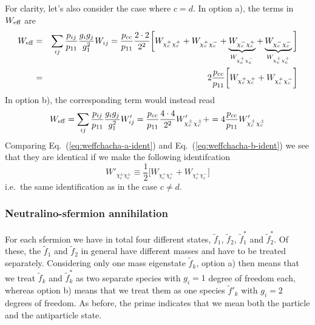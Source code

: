 \documentclass[a4paper,10pt,oneside]{book}
\begin{document}
For clarity, let's also consider the case where $c=d$.
In option a), the terms in $W_{\rm eff}$ are
\begin{eqnarray}
    W_{\rm eff} & = & \sum_{ij}\frac{p_{ij}}{p_{11}} 
    \frac{g_{i}g_{j}}{g_{1}^2} W_{ij}
    =
    \frac{p_{cc}}{p_{11}} \frac{2 \cdot 2}{2^2}
    \bigg[ 
    W_{\chi_{c}^+ \chi_{c}^+} +
    W_{\chi_{c}^+ \chi_{c}^-} +
    \underbrace{W_{\chi_{c}^- \chi_{c}^+}}_{W_{\chi_{c}^+ \chi_{c}^-}} +
    \underbrace{W_{\chi_{c}^- \chi_{c}^-}}_{W_{\chi_{c}^+ \chi_{c}^+}}
    \bigg] 
    \nonumber \\
    & = &
    2 \frac{p_{cc}}{p_{11}}
    \bigg[
    W_{\chi_{c}^+ \chi_{c}^+} +
    W_{\chi_{c}^+ \chi_{c}^-}
    \bigg]
    \label{eq:weffchacha-a-ident}
\end{eqnarray}
In option b), the corresponding term would instead read
\begin{equation}
    W_{\rm eff} = \sum_{ij}\frac{p_{ij}}{p_{11}} 
    \frac{g_{i}g_{j}}{g_{1}^2} W'_{ij} =
    \frac{p_{cc}}{p_{11}} \frac{4 \cdot 4}{2^2}
    W'_{\chi_{c}^\pm \chi_{c}^\pm} +
     = 4 \frac{p_{cc}}{p_{11}} W'_{\chi_{c}^\pm \chi_{c}^\pm}
    \label{eq:weffchacha-b-ident}
\end{equation}
Comparing Eq.~(\ref{eq:weffchacha-a-ident}) and 
Eq.~(\ref{eq:weffchacha-b-ident}) 
we see that they are identical if we make the following identifcation
\begin{equation}
    W'_{\chi_{c}^\pm \chi_{c}^\pm} \equiv \frac{1}{2} 
        \bigg[
    W_{\chi_{c}^+ \chi_{c}^+} +
    W_{\chi_{c}^+ \chi_{c}^-}
    \bigg]
\end{equation} 
i.e.\ the same identification as in the case $c \ne d$.

\subsubsection{Neutralino-sfermion annihilation}

For each sfermion we have in total four different states,
$\tilde{f}_{1}$, $\tilde{f}_{2}$, $\tilde{f}_{1}^{*}$ and
$\tilde{f}_{2}^{*}$.  Of these, the $\tilde{f}_{1}$ and
$\tilde{f}_{2}$ in general have different masses and have to be treated
separately.  Considering only one mass eigenstate $\tilde{f}_{k}$,
option a) then means that we treat $\tilde{f}_{k}$ and
$\tilde{f}_{k}^{*}$ as two separate species with $g_{i}=1$ degree of
freedom each, whereas option b) means that we treat them as one
species $\tilde{f}'_{k}$ with $g_{i}=2$ degrees of freedom.  As
before, the prime indicates that we mean both the particle and the
antiparticle state.
\end{document}
